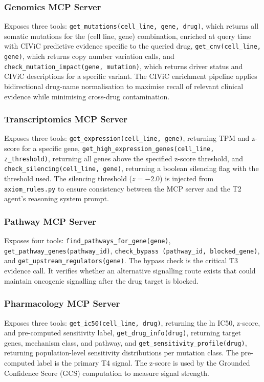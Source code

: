 \documentclass{article}
\begin{document}
\subsubsection{Genomics MCP Server}
Exposes three tools: \texttt{get\_mutations(cell\_line, gene, drug)}, which returns all somatic mutations for the (cell line, gene) combination, enriched at query time with CIViC predictive evidence specific to the queried drug, \texttt{get\_cnv(cell\_line, gene)}, which returns copy number variation calls, and \texttt{check\_mutation\_impact(gene, mutation)}, which returns driver status and CIViC descriptions for a specific variant. The CIViC enrichment pipeline applies bidirectional drug-name normalisation to maximise recall of relevant clinical evidence while minimising cross-drug contamination.

\subsubsection{Transcriptomics MCP Server}
Exposes three tools: \texttt{get\_expression(cell\_line, gene)}, returning TPM and z-score for a specific gene, \texttt{get\_high\_expression\_genes(cell\_line, z\_threshold)}, returning all genes above the specified z-score threshold, and \texttt{check\_silencing(cell\_line, gene)}, returning a boolean silencing flag with the threshold used. The silencing threshold ($z = -2.0$) is injected from \texttt{axiom\_rules.py} to ensure consistency between the MCP server and the T2 agent's reasoning system prompt.

\subsubsection{Pathway MCP Server}
Exposes four tools: \texttt{find\_pathways\_for\_gene(gene)}, \texttt{get\_pathway\_genes(pathway\_id)}, \texttt{check\_bypass (pathway\_id, blocked\_gene)}, and \texttt{get\_upstream\_regulators(gene)}. The bypass check is the critical T3 evidence call. It verifies whether an alternative signalling route exists that could maintain oncogenic signalling after the drug target is blocked.

\subsubsection{Pharmacology MCP Server}
Exposes three tools: \texttt{get\_ic50(cell\_line, drug)}, returning the ln IC50, z-score, and pre-computed sensitivity label, \texttt{get\_drug\_info(drug)}, returning target genes, mechanism class, and pathway, and \texttt{get\_sensitivity\_profile(drug)}, returning population-level sensitivity distributions per mutation class. The pre-computed label is the primary T4 signal. The z-score is used by the Grounded Confidence Score (GCS) computation to measure signal strength.
\end{document}
